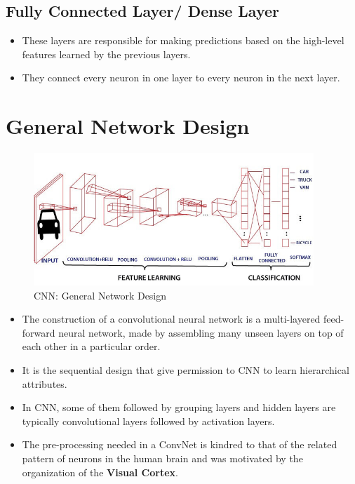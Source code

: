 \subsection{Fully Connected Layer/ Dense Layer \cite{gfg-convolutional-neural-network-cnn-in-machine-learning}} \label{cnn: Fully Connected Layer/ Dense Layer}

\begin{itemize}
    \item These layers are responsible for making predictions based on the high-level features learned by the previous layers. 
    
    \item They connect every neuron in one layer to every neuron in the next layer.
\end{itemize}


\section{General Network Design \cite{gfg-convolutional-neural-network-cnn-in-machine-learning}}\label{cnn: General Network Design}

\begin{figure}[h]
    \centering
    \includegraphics[width=\linewidth, height=5cm, keepaspectratio]{Pictures/convolutional-neural-network/convolutional-neural-network.jpg}
    \caption{CNN: General Network Design}
\end{figure}

\begin{itemize}
    \item The construction of a convolutional neural network is a multi-layered feed-forward neural network, made by assembling many unseen layers on top of each other in a particular order.

    \item It is the sequential design that give permission to CNN to learn hierarchical attributes.
    
    \item In CNN, some of them followed by grouping layers and hidden layers are typically convolutional layers followed by activation layers.
    
    \item The pre-processing needed in a ConvNet is kindred to that of the related pattern of neurons in the human brain and was motivated by the organization of the \textbf{Visual Cortex}.
\end{itemize}


